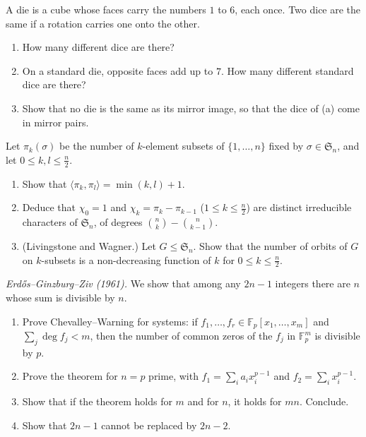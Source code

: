 \begin{exercise}[$\star$]\label{pb:dice}
A die is a cube whose faces carry the numbers $1$ to $6$, each once. Two dice are the same if a rotation carries one onto the
other.
\begin{enumerate}[label=(\alph*)]
\item How many different dice are there?
\item On a standard die, opposite faces add up to $7$. How many different standard dice are there?
\item Show that no die is the same as its mirror image, so that the dice of (a) come in mirror pairs.
\end{enumerate}
\end{exercise}

\begin{exercise}[$\star\star\star$]\label{pb:ksubsets}
Let $\pi_k(\sigma)$ be the number of $k$-element subsets of $\{1,\dots,n\}$ fixed by $\sigma\in\mathfrak S_n$, and let
$0\le k,l\le\frac n2$.
\begin{enumerate}[label=(\alph*)]
\item Show that $\langle\pi_k,\pi_l\rangle=\min(k,l)+1$.
\item Deduce that $\chi_0=1$ and $\chi_k=\pi_k-\pi_{k-1}$ ($1\le k\le\frac n2$) are distinct irreducible characters of
$\mathfrak S_n$, of degrees $\binom nk-\binom n{k-1}$.
\item (Livingstone and Wagner.) Let $G\le\mathfrak S_n$. Show that the number of orbits of $G$ on $k$-subsets is a
non-decreasing function of $k$ for $0\le k\le\frac n2$.
\end{enumerate}
\end{exercise}

\begin{exercise}[$\star\star$]\label{pb:egz}
\emph{Erdős--Ginzburg--Ziv (1961).} We show that among any $2n-1$ integers there are $n$ whose sum is divisible by $n$.
\begin{enumerate}[label=(\alph*)]
\item Prove Chevalley--Warning for systems: if $f_1,\dots,f_r\in\mathbb F_p[x_1,\dots,x_m]$ and $\sum_j\deg f_j<m$, then the number
of common zeros of the $f_j$ in $\mathbb F_p^m$ is divisible by $p$.
\item Prove the theorem for $n=p$ prime, with $f_1=\sum_ia_ix_i^{p-1}$ and $f_2=\sum_ix_i^{p-1}$.
\item Show that if the theorem holds for $m$ and for $n$, it holds for $mn$. Conclude.
\item Show that $2n-1$ cannot be replaced by $2n-2$.
\end{enumerate}
\end{exercise}

